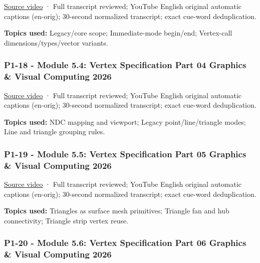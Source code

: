 \hypertarget{04-visual-computing-ii-ch036-p1-17---module-5.3-vertex-specification-part-03-graphics-visual-computing-2026}{}

\href{https://www.youtube.com/watch?v=QGwjwKvDF0I}{Source video} · Full transcript reviewed; YouTube English original automatic captions (en-orig); 30-second normalized transcript; exact cue-word deduplication.

\textbf{Topics used:} Legacy/core scope; Immediate-mode begin/end; Vertex-call dimensions/types/vector variants.

\subsubsection{P1-18 - Module 5.4: Vertex Specification Part 04 Graphics \& Visual Computing 2026}\label{04-visual-computing-ii-ch036-p1-18---module-5.4-vertex-specification-part-04-graphics-visual-computing-2026}

\hypertarget{04-visual-computing-ii-ch036-p1-18---module-5.4-vertex-specification-part-04-graphics-visual-computing-2026}{}

\href{https://www.youtube.com/watch?v=yNa86goEb64}{Source video} · Full transcript reviewed; YouTube English original automatic captions (en-orig); 30-second normalized transcript; exact cue-word deduplication.

\textbf{Topics used:} NDC mapping and viewport; Legacy point/line/triangle modes; Line and triangle grouping rules.

\subsubsection{P1-19 - Module 5.5: Vertex Specification Part 05 Graphics \& Visual Computing 2026}\label{04-visual-computing-ii-ch036-p1-19---module-5.5-vertex-specification-part-05-graphics-visual-computing-2026}

\hypertarget{04-visual-computing-ii-ch036-p1-19---module-5.5-vertex-specification-part-05-graphics-visual-computing-2026}{}

\href{https://www.youtube.com/watch?v=IaV0iweZLxY}{Source video} · Full transcript reviewed; YouTube English original automatic captions (en-orig); 30-second normalized transcript; exact cue-word deduplication.

\textbf{Topics used:} Triangles as surface mesh primitives; Triangle fan and hub connectivity; Triangle strip vertex reuse.

\subsubsection{P1-20 - Module 5.6: Vertex Specification Part 06 Graphics \& Visual Computing 2026}\label{04-visual-computing-ii-ch036-p1-20---module-5.6-vertex-specification-part-06-graphics-visual-computing-2026}

